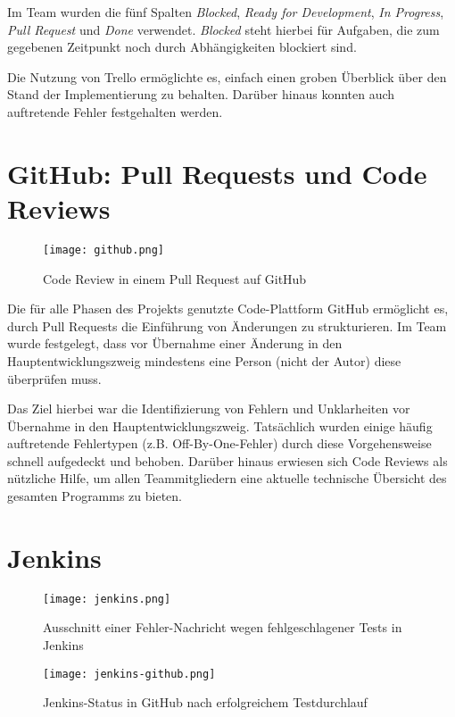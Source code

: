 Im Team wurden die fünf Spalten \textit{Blocked}, \textit{Ready for Development}, \textit{In Progress}, \textit{Pull Request} und \textit{Done} verwendet.
\textit{Blocked} steht hierbei für Aufgaben, die zum gegebenen Zeitpunkt noch durch Abhängigkeiten blockiert sind.

Die Nutzung von Trello ermöglichte es, einfach einen groben Überblick über den Stand der Implementierung zu behalten. 
Darüber hinaus konnten auch auftretende Fehler festgehalten werden.

\section{GitHub: Pull Requests und Code Reviews}

\begin{figure}[H]
\caption{Code Review in einem Pull Request auf GitHub}
\centering
\texttt{[image: github.png]}
\end{figure}

Die für alle Phasen des Projekts genutzte Code-Plattform GitHub ermöglicht es, durch Pull Requests die Einführung von Änderungen zu strukturieren.
Im Team wurde festgelegt, dass vor Übernahme einer Änderung in den Hauptentwicklungszweig mindestens eine Person (nicht der Autor) diese überprüfen muss.

Das Ziel hierbei war die Identifizierung von Fehlern und Unklarheiten vor Übernahme in den Hauptentwicklungszweig.
Tatsächlich wurden einige häufig auftretende Fehlertypen (z.B. Off-By-One-Fehler) durch diese Vorgehensweise schnell aufgedeckt und behoben.
Darüber hinaus erwiesen sich Code Reviews als nützliche Hilfe, um allen Teammitgliedern eine aktuelle technische Übersicht des gesamten Programms zu bieten.

\newpage
\section{Jenkins}

\begin{figure}[H]
\caption{Ausschnitt einer Fehler-Nachricht wegen fehlgeschlagener Tests in Jenkins}
\centering
\texttt{[image: jenkins.png]}
\end{figure}

\begin{figure}[H]
\caption{Jenkins-Status in GitHub nach erfolgreichem Testdurchlauf}
\centering
\texttt{[image: jenkins-github.png]}
\end{figure}

